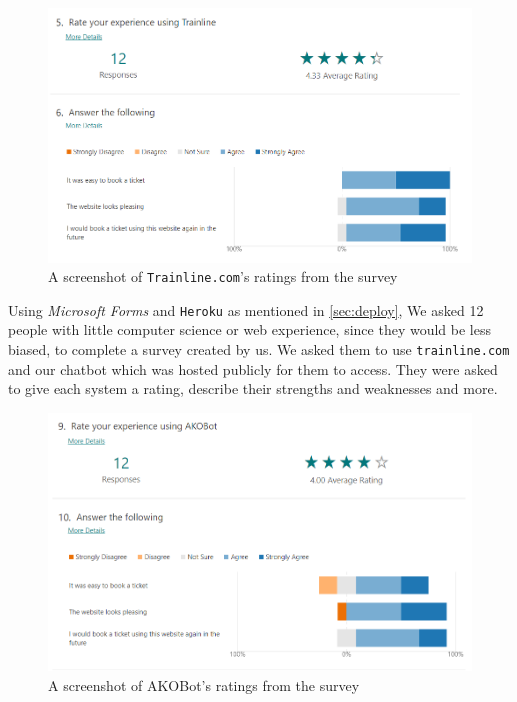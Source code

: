 \documentclass[11pt]{article}
\newcommand{\code}[1]{{\texttt{#1}}}
\begin{document}
    \begin{figure}[!ht]
        \centering
        \includegraphics[width=\textwidth]{TrainlineEval.png}
        \caption{A screenshot of \code{Trainline.com}'s ratings from the survey}
        \label{fig:evaltrainline}
    \end{figure}
    
    Using \textit{Microsoft Forms} and \code{Heroku} as mentioned in \cref{sec:deploy}, We asked 12 people with little computer science or web experience, since they would be less biased, to complete a survey created by us. We asked them to use \code{trainline.com} and our chatbot which was hosted publicly for them to access. They were asked to give each system a rating, describe their strengths and weaknesses and more.
    
    \begin{figure}[!ht]
        \centering
        \includegraphics[width=\textwidth]{AkobotEval.png}
        \caption{A screenshot of AKOBot's ratings from the survey}
        \label{fig:evalakobot}
    \end{figure}
    
\end{document}
